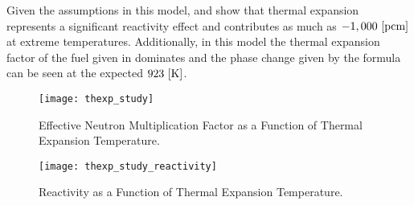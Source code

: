   Given the assumptions in this model,  and
   show that thermal expansion represents a
  significant reactivity effect and contributes as much as $-1,000 \,\left[\text{{pcm}}\right]$
  at extreme temperatures. Additionally, in this model the thermal expansion
  factor of the fuel given in  dominates and the phase change 
  given by the formula can be seen at the expected $923 \,\left[\text{{K}}\right]$.

  \begin{figure}
    \centering
    \texttt{[image: thexp\_study]}
    \caption{Effective Neutron Multiplication Factor as a Function of 
      Thermal Expansion Temperature.}
    \label{fig:thexp_study}
  \end{figure}

  \begin{figure}
    \centering
    \texttt{[image: thexp\_study\_reactivity]}
    \caption{Reactivity as a Function of Thermal Expansion Temperature.}
    \label{fig:thexp_study_reactivity}
  \end{figure}


